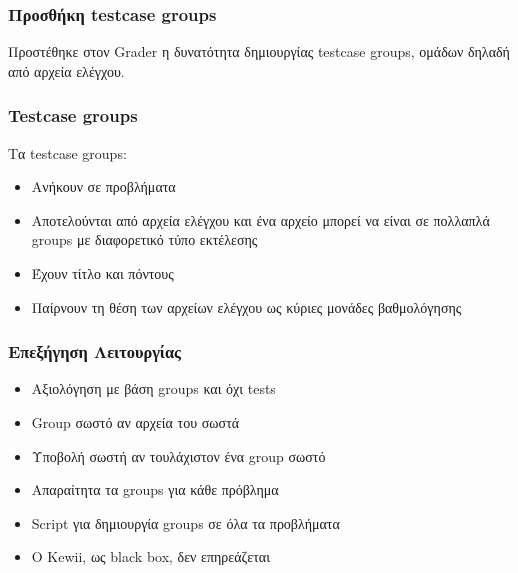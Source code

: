 \documentclass{beamer}
\begin{document}
\begin{frame}
  \frametitle{Προσθήκη testcase groups}

  Προστέθηκε στον Grader η δυνατότητα δημιουργίας testcase groups, ομάδων
  δηλαδή από αρχεία ελέγχου.

\end{frame}

\begin{frame}
  \frametitle{Testcase groups}

  Τα testcase groups:

  \begin{itemize}
      \item Ανήκουν σε προβλήματα
      \item Αποτελούνται από αρχεία ελέγχου και ένα αρχείο μπορεί να είναι
        σε πολλαπλά groups με διαφορετικό τύπο εκτέλεσης
      \item Έχουν τίτλο και πόντους
      \item Παίρνουν τη θέση των αρχείων ελέγχου ως κύριες μονάδες βαθμολόγησης
  \end{itemize}
\end{frame}

\begin{frame}
  \frametitle{Επεξήγηση Λειτουργίας}

  \begin{itemize}
      \item Αξιολόγηση με βάση groups και όχι tests
      \item Group σωστό αν αρχεία του σωστά
      \item Υποβολή σωστή αν τουλάχιστον ένα group σωστό
      \item Απαραίτητα τα groups για κάθε πρόβλημα
      \item Script για δημιουργία groups σε όλα τα προβλήματα
      \item Ο Kewii, ως black box, δεν επηρεάζεται
  \end{itemize}
\end{frame}
\end{document}
